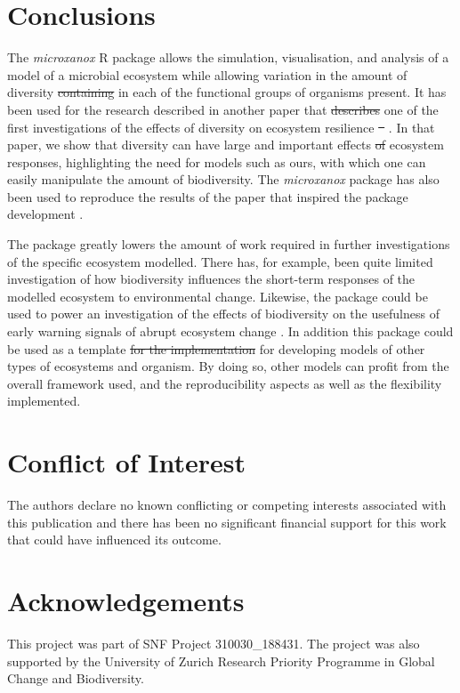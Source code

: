 \documentclass[]{elsarticle} %
\providecommand{\DIFaddtex}[1]{{\protect\color{blue}\uwave{#1}}} %
\providecommand{\DIFdeltex}[1]{{\protect\color{red}\sout{#1}}}                      %
\providecommand{\DIFaddbegin}{} %
\providecommand{\DIFaddend}{} %
\providecommand{\DIFdelbegin}{} %
\providecommand{\DIFdelend}{} %
\providecommand{\DIFadd}[1]{\texorpdfstring{\DIFaddtex{#1}}{#1}} %
\providecommand{\DIFdel}[1]{\texorpdfstring{\DIFdeltex{#1}}{}} %
\newcommand{\DIFscaledelfig}{0.5}
\newlength{\DIFdelgraphicswidth} %
\newlength{\DIFdelgraphicsheight} %
\newcommand{\DIFaddincludegraphics}[2][]{{\color{blue}\fbox{\DIFOincludegraphics[#1]{#2}}}} %
\newcommand{\DIFdelincludegraphics}[2][]{%
\sbox{\DIFdelgraphicsbox}{\DIFOincludegraphics[#1]{#2}}%
\settoboxwidth{\DIFdelgraphicswidth}{\DIFdelgraphicsbox} %
\settoboxtotalheight{\DIFdelgraphicsheight}{\DIFdelgraphicsbox} %
\scalebox{\DIFscaledelfig}{%
\parbox[b]{\DIFdelgraphicswidth}{\usebox{\DIFdelgraphicsbox}\\[-\baselineskip] \rule{\DIFdelgraphicswidth}{0em}}\llap{\resizebox{\DIFdelgraphicswidth}{\DIFdelgraphicsheight}{%
\setlength{\unitlength}{\DIFdelgraphicswidth}%
\begin{picture}(1,1)%
\thicklines\linethickness{2pt} %
{\color[rgb]{1,0,0}\put(0,0){\framebox(1,1){}}}%
{\color[rgb]{1,0,0}\put(0,0){\line( 1,1){1}}}%
{\color[rgb]{1,0,0}\put(0,1){\line(1,-1){1}}}%
\end{picture}%
}\hspace*{3pt}}} %
} %
\DeclareRobustCommand{\DIFaddbegin}{\DIFOaddbegin \let\includegraphics\DIFaddincludegraphics} %
\DeclareRobustCommand{\DIFaddend}{\DIFOaddend \let\includegraphics\DIFOincludegraphics} %
\DeclareRobustCommand{\DIFdelbegin}{\DIFOdelbegin \let\includegraphics\DIFdelincludegraphics} %
\DeclareRobustCommand{\DIFdelend}{\DIFOaddend \let\includegraphics\DIFOincludegraphics} %
\begin{document}
\hypertarget{conclusions}{%
\section{Conclusions}\label{conclusions}}

The \emph{microxanox} R package allows the simulation, visualisation, and analysis of a model of a microbial ecosystem while allowing variation in the amount of diversity \DIFdelbegin \DIFdel{containing }\DIFdelend \DIFaddbegin \DIFadd{present }\DIFaddend in each of the functional groups of organisms present. It has been used for the research described in another paper that \DIFdelbegin \DIFdel{describes }\DIFdelend \DIFaddbegin \DIFadd{provides }\DIFaddend one of the first investigations of the effects of diversity on ecosystem resilience \DIFdelbegin \DIFdel{\mbox{%
\citet{Limberger2022}}\hskip0pt%
}\DIFdelend \DIFaddbegin \DIFadd{\mbox{%
\citet{Limberger2023}}\hskip0pt%
}\DIFaddend . In that paper, we show that diversity can have large and important effects \DIFdelbegin \DIFdel{of }\DIFdelend \DIFaddbegin \DIFadd{on }\DIFaddend ecosystem responses, highlighting the need for models such as ours, with which one can easily manipulate the amount of biodiversity. The \emph{microxanox} package has also been used to reproduce the results of the paper that inspired the package development \citep{Bush2017}.

The package greatly lowers the amount of work required in further investigations of the specific ecosystem modelled. There has, for example, been quite limited investigation of how biodiversity influences the short-term responses of the modelled ecosystem to environmental change. Likewise, the package could be used to power an investigation of the effects of biodiversity on the usefulness of early warning signals of abrupt ecosystem change \citep{Scheffer2009}. In addition this package could be used as a template \DIFdelbegin \DIFdel{for the implementation }\DIFdelend for developing models of other types of ecosystems and organism. By doing so, other models can profit from the overall framework used, and the reproducibility aspects as well as the flexibility implemented.

\hypertarget{conflict-of-interest}{%
\section{Conflict of Interest}\label{conflict-of-interest}}

The authors declare no known conflicting or competing interests associated with this publication and there has been no significant financial support for this work that could have influenced its outcome.

\hypertarget{acknowledgements}{%
\section{Acknowledgements}\label{acknowledgements}}

This project was part of SNF Project 310030\_188431. The project was also supported by the University of Zurich Research Priority Programme in Global Change and Biodiversity.

\renewcommand\refname{References}

\end{document}
